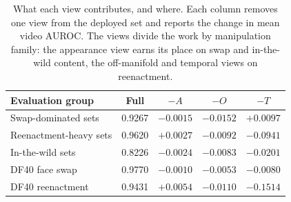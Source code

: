 \begin{table}[t]
\centering
\caption{What each view contributes, and where. Each column removes one view from the deployed set and reports the change in mean video AUROC. The views divide the work by manipulation family: the appearance view earns its place on swap and in-the-wild content, the off-manifold and temporal views on reenactment.}
\label{tab:viewrole}
\small
\begin{tabular}{lcccc}
\toprule
Evaluation group & Full & $-A$ & $-O$ & $-T$ \\
\midrule
Swap-dominated sets & 0.9267 & $-0.0015$ & $-0.0152$ & $+0.0097$ \\
Reenactment-heavy sets & 0.9620 & $+0.0027$ & $-0.0092$ & $-0.0941$ \\
In-the-wild sets & 0.8226 & $-0.0024$ & $-0.0083$ & $-0.0201$ \\
\midrule
DF40 face swap & 0.9770 & $-0.0010$ & $-0.0053$ & $-0.0080$ \\
DF40 reenactment & 0.9431 & $+0.0054$ & $-0.0110$ & $-0.1514$ \\
\bottomrule
\end{tabular}
\end{table}
